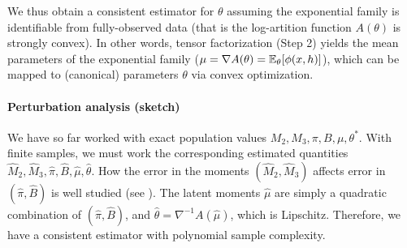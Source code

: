We thus obtain a consistent estimator for $\theta$ assuming the exponential
family is identifiable from fully-observed data (that is
the log-artition function $A(\theta)$ is strongly convex).
In other words,
tensor factorization (Step 2) yields the mean parameters of the exponential family
($\mu = \nabla A(\theta) = \mathbb{E}_\theta[\phi(x, h)]$),
which can be mapped to (canonical) parameters $\theta$ via convex optimization.

\paragraph{Perturbation analysis (sketch)}
We have so far worked with exact population values $M_2,M_3,\pi,B,\mu,\theta^*$.
With finite samples, we must work the corresponding estimated quantities $\hat M_2,\hat M_3,\hat\pi,\hat B,\hat\mu,\hat\theta$.
How the error in the moments $(\hat M_2,\hat M_3)$ affects error in $(\hat\pi,\hat B)$ is well studied
(see \citet{anandkumar12moments,anandkumar13tensor}).
The latent moments $\hat\mu$ are simply a quadratic combination of $(\hat\pi,\hat B)$,
and $\hat\theta = \nabla^{-1} A(\hat\mu)$, which is Lipschitz.
Therefore, we have a consistent estimator with polynomial sample complexity.

